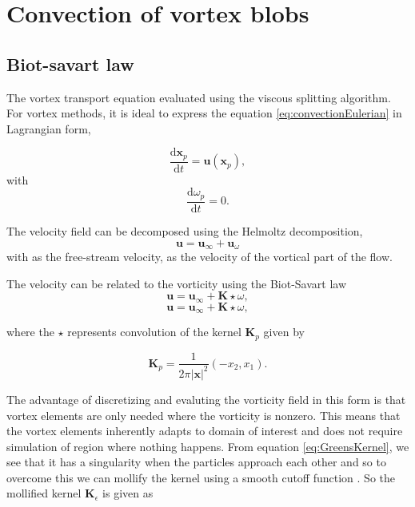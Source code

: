 \section{Convection of vortex blobs}


\subsection{Biot-savart law}
The vortex transport equation evaluated using the viscous splitting algorithm. For vortex methods, it is ideal to express the equation \ref{eq:convectionEulerian} in Lagrangian form,

\begin{equation}
\frac{\mathrm{d}\mathbf{x}_p}{\mathrm{d}t} = \mathbf{u}\left(\mathbf{x}_p\right),
\end{equation}
with
\begin{equation}
\frac{\mathrm{d}\omega_p}{\mathrm{d}t} = 0.
\end{equation}

The velocity field can be decomposed using the Helmoltz decomposition,
\begin{equation}
\mathbf{u} = \mathbf{u}_{\infty} + \mathbf{u}_{\omega}
\end{equation}
with  as the free-stream velocity,  as the velocity of the vortical part of the flow.


The velocity can be related to the vorticity using the Biot-Savart law
\begin{equation}
\mathbf{u} = \mathbf{u}_{\infty} + \mathbf{K}\star\omega,
\end{equation}
\begin{equation}
\mathbf{u} = \mathbf{u}_{\infty} + \mathbf{K}\star\omega,
\end{equation}

where the $\star$ represents convolution of the kernel $\mathbf{K}_p$ given by

\begin{equation}
\mathbf{K}_p = \frac{1}{2\pi\left|\mathbf{x}\right|^2}\left(-x_2,x_1\right).
\label{eq:GreensKernel}
\end{equation}

The advantage of discretizing and evaluting the vorticity field in this form is that vortex elements are only needed where the vorticity is nonzero. This means that the vortex elements inherently adapts to domain of interest and does not require simulation of region where nothing happens. From equation \ref{eq:GreensKernel}, we see that it has a singularity when the particles approach each other and so to overcome this we can mollify the kernel using a smooth cutoff function . So the mollified kernel $\mathbf{K}_{\epsilon}$ is given as 

